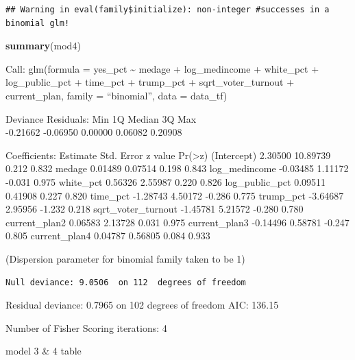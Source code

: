 \documentclass[
]{article}
\newenvironment{Shaded}{\begin{snugshade}}{\end{snugshade}}
\newcommand{\KeywordTok}[1]{\textcolor[rgb]{0.13,0.29,0.53}{\textbf{#1}}}
\newcommand{\NormalTok}[1]{#1}
\begin{document}
\begin{verbatim}
## Warning in eval(family$initialize): non-integer #successes in a binomial glm!
\end{verbatim}

\begin{Shaded}
\begin{Highlighting}[]
\KeywordTok{summary}\NormalTok{(mod4)}
\end{Highlighting}
\end{Shaded}

Call: glm(formula = yes\_pct \textasciitilde{} medage + log\_medincome +
white\_pct + log\_public\_pct + time\_pct + trump\_pct +
sqrt\_voter\_turnout + current\_plan, family = ``binomial'', data =
data\_tf)

Deviance Residuals: Min 1Q Median 3Q Max\\
-0.21662 -0.06950 0.00000 0.06082 0.20908

Coefficients: Estimate Std. Error z value
Pr(\textgreater\textbar z\textbar) (Intercept) 2.30500 10.89739 0.212
0.832 medage 0.01489 0.07514 0.198 0.843 log\_medincome -0.03485 1.11172
-0.031 0.975 white\_pct 0.56326 2.55987 0.220 0.826 log\_public\_pct
0.09511 0.41908 0.227 0.820 time\_pct -1.28743 4.50172 -0.286 0.775
trump\_pct -3.64687 2.95956 -1.232 0.218 sqrt\_voter\_turnout -1.45781
5.21572 -0.280 0.780 current\_plan2 0.06583 2.13728 0.031 0.975
current\_plan3 -0.14496 0.58781 -0.247 0.805 current\_plan4 0.04787
0.56805 0.084 0.933

(Dispersion parameter for binomial family taken to be 1)

\begin{verbatim}
Null deviance: 9.0506  on 112  degrees of freedom
\end{verbatim}

Residual deviance: 0.7965 on 102 degrees of freedom AIC: 136.15

Number of Fisher Scoring iterations: 4

model 3 \& 4 table
\end{document}
